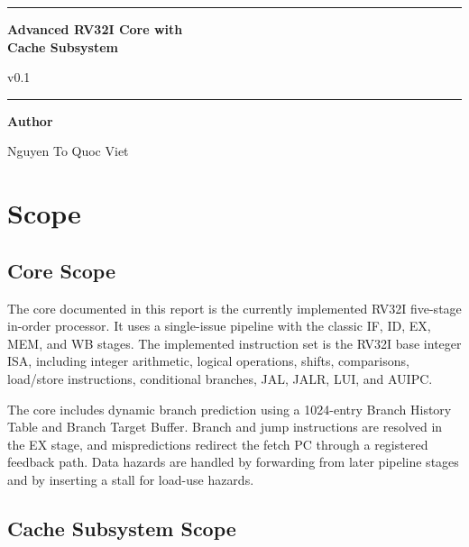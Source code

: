 \documentclass[11pt,a4paper]{article}
\newcommand{\coverTitle}{Advanced RV32I Core with\\Cache Subsystem}
\newcommand{\documentVersion}{v0.1}
\newcommand{\authorName}{Nguyen To Quoc Viet}
\begin{document}
\begin{titlepage}
\centering
\vspace*{2.5cm}

\rule{0.8\linewidth}{0.6pt}
\vspace{0.6cm}

{\Huge\bfseries \coverTitle \par}
\vspace{0.4cm}
{\Large\ttfamily \documentVersion \par}

\vspace{0.6cm}
\rule{0.8\linewidth}{0.6pt}

\vfill

{\large\bfseries Author\par}
\vspace{0.3cm}
{\Large \authorName \par}

\end{titlepage}

\newpage
\renewcommand{\contentsname}{Table of Contents}
\tableofcontents
\pagebreak

\section{Scope}

\subsection{Core Scope}

The core documented in this report is the currently implemented RV32I
five-stage in-order processor. It uses a single-issue pipeline with the
classic IF, ID, EX, MEM, and WB stages. The implemented instruction set is
the RV32I base integer ISA, including integer arithmetic, logical
operations, shifts, comparisons, load/store instructions, conditional
branches, JAL, JALR, LUI, and AUIPC.

The core includes dynamic branch prediction using a 1024-entry Branch
History Table and Branch Target Buffer. Branch and jump instructions are
resolved in the EX stage, and mispredictions redirect the fetch PC through
a registered feedback path. Data hazards are handled by forwarding from
later pipeline stages and by inserting a stall for load-use hazards.

\subsection{Cache Subsystem Scope}
\end{document}
